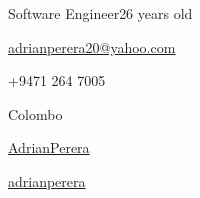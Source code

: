 \documentclass[11pt]{spidercv}
\begin{document}
    \begin{TopBar}{\ColorTextSide}
         {Software Engineer}{26 years old \newline}
    
        \begin{DoubleColumns}
            \begin{ItemList}{\ColorHighlight}
                \item [\Large\faAt] \href{mailto:adrianperera20@yahoo.com}{adrianperera20@yahoo.com}
                \item [\Large\faMobile] +9471 264 7005
                \item [\Large\faMapMarker] Colombo
            \end{ItemList}
            \nextcolumn
            \begin{ItemList}{\ColorHighlight}
                \item [\Large\faGithub] \href{https://github.com/AdrianPerera}{AdrianPerera}
                \item [\Large\faLinkedinSquare] \href{https://www.linkedin.com/in/adrianperera/}{adrianperera}
            \end{ItemList}
        \end{DoubleColumns}

    \end{TopBar}
\end{document}
